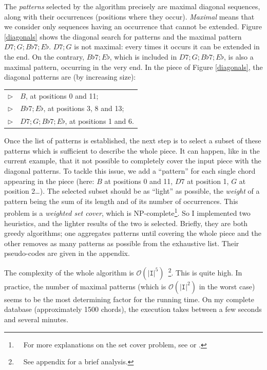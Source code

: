 \documentclass[a4paper,10pt]{article}
\newcommand{\guill}[1]{“#1”}
\newcommand{\bigO}[1]{\mathcal O\left( #1 \right)}
\begin{document}
The \emph{patterns} selected by the algorithm precisely are maximal diagonal sequences, along with their occurrences (positions where they occur). \emph{Maximal} means that we consider only sequences having an occurrence that cannot be extended. Figure \ref{diagonals} shows the diagonal search for patterns and the maximal pattern $D7;G;B\flat 7;E\flat$. $D7;G$ is not maximal: every times it occurs it can be extended in the end. On the contrary, $B\flat 7;E\flat$, which is included in $D7;G;B\flat 7;E\flat$, is also a maximal pattern, occurring in the very end. In the piece of Figure \ref{diagonals}, the diagonal patterns are (by increasing size):

\begin{tabular}{rl}
$\triangleright$ & $B$, at positions 0 and 11; \\
$\triangleright$ & $B\flat 7;E\flat$, at positions 3, 8 and 13; \\
$\triangleright$ & $D7;G;B\flat 7;E\flat$, at positions 1 and 6.\\
\end{tabular}

Once the list of patterns is established, the next step is to select a subset of these patterns which is sufficient to describe the whole piece. It can happen, like in the current example, that it not possible to completely cover the input piece with the diagonal patterns. To tackle this issue, we add a \guill{pattern} for each single chord appearing in the piece (here: $B$ at positions 0 and 11, $D7$ at position 1, $G$ at position 2\dots). The selected subset should be as \guill{light} as possible, the \emph{weight} of a pattern being the sum of its length and of its number of occurrences. This problem is a \emph{weighted set cover}, which is NP-complete\footnote{~~For more explanations on the set cover problem, see \cite{karpNP} or \cite{cormen}.}. So I implemented two heuristics, and the lighter results of the two is selected. Briefly, they are both greedy algorithms; one aggregates patterns until covering the whole piece and the other removes as many patterns as possible from the exhaustive list. Their pseudo-codes are given in the appendix.

The complexity of the whole algorithm is $\bigO{|\texttt{I}|^5}$~\footnote{~~See appendix for a brief analysis.}. This is quite high. In practice, the number of maximal patterns (which is $\bigO{|\texttt{I}|^2}$ in the worst case) seems to be the most determining factor for the running time. On my complete database (approximately 1500 chords), the execution takes between a few seconds and several minutes.
\end{document}
